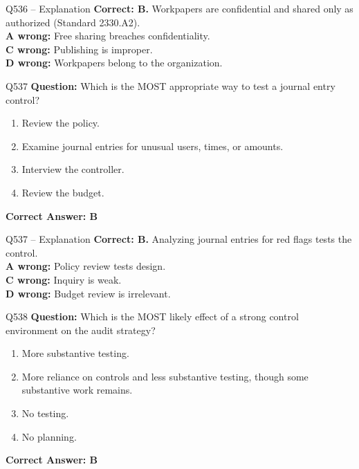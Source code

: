 \documentclass[aspectratio=169,10pt]{beamer}
\begin{document}
	\begin{frame}[t]{Q536 -- Explanation}
		\small
		\textbf{Correct: B.} Workpapers are confidential and shared only as authorized (Standard 2330.A2). \\[4pt]
		\textbf{A wrong:} Free sharing breaches confidentiality. \\[2pt]
		\textbf{C wrong:} Publishing is improper. \\[2pt]
		\textbf{D wrong:} Workpapers belong to the organization.
	\end{frame}
	
	\begin{frame}[t]{Q537}
		\small
		\textbf{Question:} Which is the MOST appropriate way to test a journal entry control?
		\begin{enumerate}[label=\Alph*.,itemsep=1pt,topsep=2pt]
			\item Review the policy.
			\item Examine journal entries for unusual users, times, or amounts.
			\item Interview the controller.
			\item Review the budget.
		\end{enumerate}
		\vspace{4pt}
		\textbf{Correct Answer: B}
	\end{frame}
	
	\begin{frame}[t]{Q537 -- Explanation}
		\small
		\textbf{Correct: B.} Analyzing journal entries for red flags tests the control. \\[4pt]
		\textbf{A wrong:} Policy review tests design. \\[2pt]
		\textbf{C wrong:} Inquiry is weak. \\[2pt]
		\textbf{D wrong:} Budget review is irrelevant.
	\end{frame}
	
	\begin{frame}[t]{Q538}
		\small
		\textbf{Question:} Which is the MOST likely effect of a strong control environment on the audit strategy?
		\begin{enumerate}[label=\Alph*.,itemsep=1pt,topsep=2pt]
			\item More substantive testing.
			\item More reliance on controls and less substantive testing, though some substantive work remains.
			\item No testing.
			\item No planning.
		\end{enumerate}
		\vspace{4pt}
		\textbf{Correct Answer: B}
	\end{frame}
	
\end{document}
